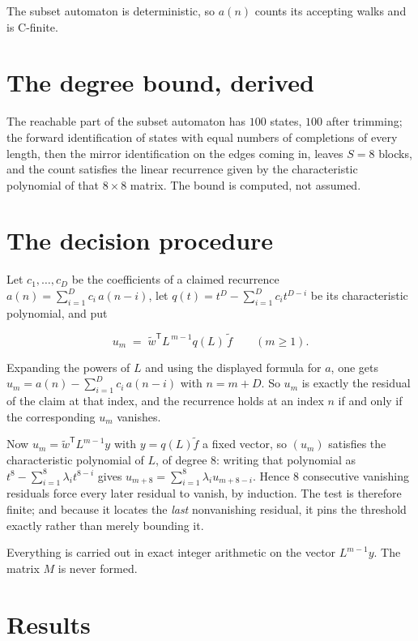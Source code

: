\documentclass[11pt]{article}
\theoremstyle{definition}
\begin{document}
The subset automaton is deterministic, so $a(n)$ counts its accepting walks and is C-finite.

\section{The degree bound, derived}

The reachable part of the subset automaton has $100$ states, $100$ after trimming; the forward identification of states with equal numbers of completions of every length, then the mirror identification on the edges coming in, leaves $S = 8$ blocks, and the count satisfies the linear recurrence given by the characteristic polynomial of that $8\times8$ matrix. The bound is computed, not assumed.

\section{The decision procedure}

Let $c_1,\dots,c_D$ be the coefficients of a claimed recurrence $a(n) = \sum_{i=1}^{D} c_i\,a(n-i)$, let $q(t) = t^{D} - \sum_{i=1}^{D} c_i t^{D-i}$ be its characteristic polynomial, and put

\[u_m \;=\; \tilde w^{\mathsf T} L^{\,m-1} q(L)\,\tilde f \qquad (m \ge 1).\]

Expanding the powers of $L$ and using the displayed formula for $a$, one gets $u_m = a(n) - \sum_{i=1}^{D} c_i\,a(n-i)$ with $n = m + D$. So $u_m$ is exactly the residual of the claim at that index, and the recurrence holds at an index $n$ if and only if the corresponding $u_m$ vanishes.

Now $u_m = \tilde w^{\mathsf T} L^{m-1} y$ with $y = q(L)\tilde f$ a fixed vector, so $(u_m)$ satisfies the characteristic polynomial of $L$, of degree $8$: writing that polynomial as $t^{8} - \sum_{i=1}^{8} \lambda_i t^{8-i}$ gives $u_{m+8} = \sum_{i=1}^{8} \lambda_i u_{m+8-i}$. Hence $8$ consecutive vanishing residuals force every later residual to vanish, by induction. The test is therefore finite; and because it locates the {\itshape last} nonvanishing residual, it pins the threshold exactly rather than merely bounding it.

Everything is carried out in exact integer arithmetic on the vector $L^{m-1}y$. The matrix $M$ is never formed.

\section{Results}
\end{document}
